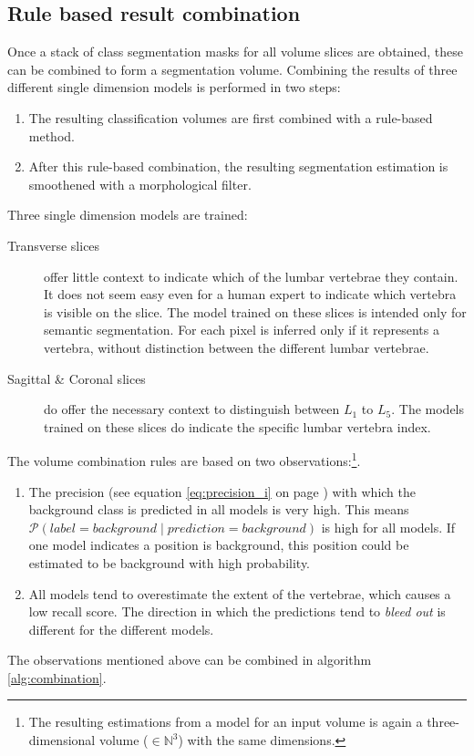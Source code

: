 \subsection{Rule based result combination}
Once a stack of class segmentation masks for all volume slices are obtained, these can be combined to form a segmentation volume.
Combining the results of three different single dimension models is performed in two steps:
\begin{enumerate}
    \item The resulting classification volumes are first combined with a rule-based method.
    \item After this rule-based combination, the resulting segmentation estimation is smoothened with a morphological filter.
\end{enumerate}

Three single dimension models are trained:
\begin{description}
    \item[Transverse slices] offer little context to indicate which of the lumbar vertebrae they contain. 
    It does not seem easy even for a human expert to indicate which vertebra is visible on the slice.
    The model trained on these slices is intended only for semantic segmentation.
    For each pixel is inferred only if it represents a vertebra, without distinction between the different lumbar vertebrae. 
    \item[Sagittal \& Coronal slices] do offer the necessary context to distinguish between $L_1$ to $L_5$. 
    The models trained on these slices do indicate the specific lumbar vertebra index. 
\end{description}

The volume combination rules are based on two observations:\footnote{
    The resulting estimations from a model for an input volume is again a three-dimensional volume ($\in \mathbb{N}^3$) with the same dimensions.
}.
\begin{enumerate}
    \item The precision (see equation \ref{eq:precision_i} on page \pageref{eq:precision_i}) with which the background class is predicted in all models is very high.
            This means $\mathcal{P} \left( label = background \mid prediction = background \right)$ is high for all models. 
            If one model indicates a position is background, this position could be estimated to be background with high probability.
    \item All models tend to overestimate the extent of the vertebrae, which causes a low recall score. The direction in which the predictions tend to \textit{bleed out} is different for the different models. 
\end{enumerate}
The observations mentioned above can be combined in algorithm \ref{alg:combination}.

